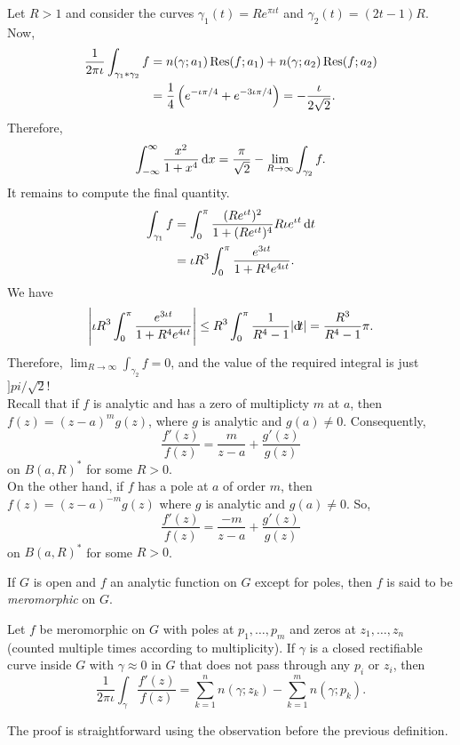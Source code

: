 	Let $R > 1$ and consider the curves $\gamma_1(t) = Re^{\pi\iota t}$ and $\gamma_2(t) = (2t-1)R$. Now,
	\begin{align*}
		\frac{1}{2\pi\iota} \int_{\gamma_1 * \gamma_2} f &= n(\gamma;a_1) \operatorname{Res}(f;a_1) + n(\gamma;a_2) \operatorname{Res}(f;a_2) \\
			&= \frac{1}{4} \left(e^{-\iota\pi/4} + e^{-3\iota\pi/4}\right) = -\frac{\iota}{2\sqrt{2}}.
	\end{align*}
	Therefore,
	\[ \int_{-\infty}^\infty \frac{x^2}{1+x^4} \dif x = \frac{\pi}{\sqrt{2}} - \lim_{R \to \infty} \int_{\gamma_2} f. \]
	It remains to compute the final quantity.
	\begin{align*}
		\int_{\gamma_1} f &= \int_0^\pi \frac{(Re^{\iota t})^2}{1 + (Re^{\iota t})^4} R\iota e^{\iota t} \dif t \\
			&= \iota R^3 \int_0^\pi \frac{e^{3\iota t}}{1 + R^4 e^{4\iota t}}.
	\end{align*}
	We have
	\[ \left| \iota R^3 \int_0^\pi \frac{e^{3\iota t}}{1 + R^4 e^{4\iota t}} \right| \le R^3 \int_0^\pi \frac{1}{R^4 - 1} |{\dif}{t}| = \frac{R^3}{R^4 - 1} \pi. \]
	Therefore, $\lim_{R\to\infty} \int_{\gamma_2} f = 0$, and the value of the required integral is just $]pi/\sqrt{2}$!\\

	Recall that if $f$ is analytic and has a zero of multiplicty $m$ at $a$, then
	$f(z) = (z-a)^m g(z)$, where $g$ is analytic and $g(a) \ne 0$. Consequently,
	\[ \frac{f'(z)}{f(z)} = \frac{m}{z-a} + \frac{g'(z)}{g(z)} \]
	on $B(a,R)^*$ for some $R > 0$.\\
	On the other hand, if $f$ has a pole at $a$ of order $m$, then $f(z) = (z-a)^{-m} g(z)$ where $g$ is analytic and $g(a) \ne 0$. So,
	\[ \frac{f'(z)}{f(z)} = \frac{-m}{z-a} + \frac{g'(z)}{g(z)} \]
	on $B(a,R)^*$ for some $R > 0$.\\

	\begin{fdef}
		If $G$ is open and $f$ an analytic function on $G$ except for poles, then $f$ is said to be \emph{meromorphic} on $G$.
	\end{fdef}

	\begin{ftheo}
		\label{argument principle}
		Let $f$ be meromorphic on $G$ with poles at $p_1,\ldots,p_m$ and zeros at $z_1,\ldots,z_n$ (counted multiple times according to multiplicity). If $\gamma$ is a closed rectifiable curve inside $G$ with $\gamma \approx 0$ in $G$ that does not pass through any $p_i$ or $z_i$, then
		\[ \frac{1}{2\pi\iota} \int_{\gamma} \frac{f'(z)}{f(z)} = \sum_{k=1}^n n(\gamma;z_k) - \sum_{k=1}^m n(\gamma;p_k). \]
	\end{ftheo}
	The proof is straightforward using the observation before the previous definition.\\

